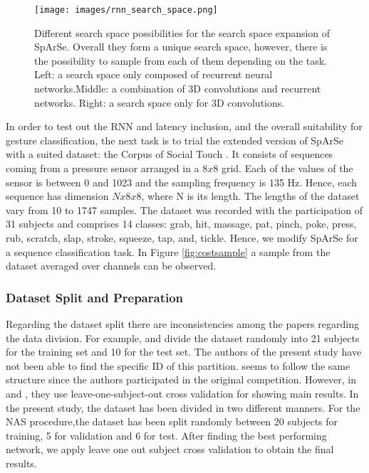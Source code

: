 \documentclass[a4paper, twocolumn]{article}
\begin{document}
\begin{figure}
	\centering
	\texttt{[image: images/rnn\_search\_space.png]}
	\caption{Different search space possibilities for the search space expansion of SpArSe. Overall they form a unique search space, however, there is the possibility to sample from each of them depending on the task. Left: a search space only composed of recurrent neural networks.Middle: a combination of 3D convolutions and recurrent networks. Right: a search space only for 3D convolutions.}
	\label{fig:rnnsearchspace}
\end{figure}


In order to test out the RNN and latency inclusion, and the overall suitability for gesture classification, the next task is to trial the extended version of SpArSe with a suited dataset: the Corpus of Social Touch \cite{Jung2014}. It consists of sequences coming from a pressure sensor arranged in a $8x8$ grid. Each of the values of the sensor is between 0 and 1023 and the sampling frequency is 135 Hz. Hence, each sequence has dimension $Nx8x8$, where N is its length. The lengths of the dataset vary from 10 to 1747 samples. The dataset was recorded with the participation of 31 subjects and comprises 14 classes: grab, hit, massage, pat, pinch, poke, press, rub, scratch, slap, stroke, squeeze, tap, and, tickle. Hence, we modify SpArSe for a sequence classification task. In Figure \ref{fig:costsample} a sample from the dataset averaged over channels can be observed.

\subsubsection{Dataset Split and Preparation}\label{SectionDataSplit}

Regarding the dataset split there are inconsistencies among the papers regarding the data division. For example, \cite{Hughes2017} and \cite{Jung2015} divide the dataset randomly into 21 subjects for the training set and 10 for the test set.  The authors of the present study have not been able to find the specific ID of this partition. \cite{Ta2015a} seems to follow the same structure since the authors participated in the original competition. However, in \cite{Albawi2018} and \cite{Jung2017}, they use leave-one-subject-out cross validation for showing main results. In the present study, the dataset has been divided in two different manners. For the NAS procedure,the dataset has been split randomly between 20 subjects for training, 5 for validation and 6 for test. After finding the best performing network, we apply leave one out subject cross validation to obtain the final results. 
\end{document}

